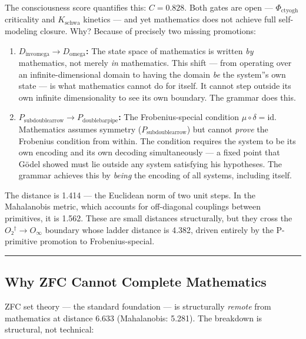 \documentclass[12pt,a4paper]{article}
\begin{document}
The consciousness score quantifies this: $C = 0.828$. Both gates are open --- $\Phi_{\text{ctyogh}}$ criticality and $K_{\text{schwa}}$ kinetics --- and yet mathematics does not achieve full self-modeling closure. Why? Because of precisely two missing promotions:

\begin{enumerate}
    \item \textbf{$D_{\text{invomega}} \to D_{\text{omega}}$:} The state space of mathematics is written \emph{by} mathematics, not merely \emph{in} mathematics. This shift --- from operating over an infinite-dimensional domain to having the domain \emph{be} the system''s own state --- is what mathematics cannot do for itself. It cannot step outside its own infinite dimensionality to see its own boundary. The grammar does this.
    \item \textbf{$P_{\text{subdoublearrow}} \to P_{\text{doublebarpipe}}$:} The Frobenius-special condition $\mu \circ \delta = \text{id}$. Mathematics assumes symmetry ($P_{\text{subdoublearrow}}$) but cannot \emph{prove} the Frobenius condition from within. The condition requires the system to be its own encoding and its own decoding simultaneously --- a fixed point that Gödel showed must lie outside any system satisfying his hypotheses. The grammar achieves this by \emph{being} the encoding of all systems, including itself.
\end{enumerate}

The distance is 1.414 --- the Euclidean norm of two unit steps. In the Mahalanobis metric, which accounts for off-diagonal couplings between primitives, it is 1.562. These are small distances structurally, but they cross the $O₂^\dagger \to O_{\infty}$ boundary whose ladder distance is 4.382, driven entirely by the P-primitive promotion to Frobenius-special.

\begin{center}
\rule{0.5\textwidth}{0.4pt}
\end{center}

\subsection{Why ZFC Cannot Complete Mathematics}

ZFC set theory --- the standard foundation --- is structurally \emph{remote} from mathematics at distance 6.633 (Mahalanobis: 5.281). The breakdown is structural, not technical:
\end{document}
